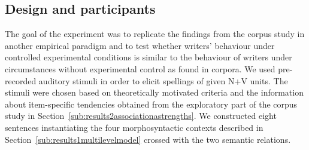 \documentclass[biblatex, charis, linguex]{glossa}\usepackage{knitr}
\begin{document}
\subsection{Design and participants}
\label{sub:designandparticipants}

The goal of the experiment was to replicate the findings from the corpus study in another empirical paradigm and to test whether writers' behaviour under controlled experimental conditions is similar to the behaviour of writers under circumstances without experimental control as found in corpora.
We used pre-recorded auditory stimuli in order to elicit spellings of given N+V units.
The stimuli were chosen based on theoretically motivated criteria and the information about item-specific tendencies obtained from the exploratory part of the corpus study in Section~\ref{sub:results2associationastrengths}.
We constructed eight sentences instantiating the four morphosyntactic contexts described in Section~\ref{sub:results1multilevelmodel} crossed with the two semantic relations.

\begin{table}[h!]
\centering
{}
\caption{Items from the experiment, chosen by context and relation, with control for lexical attraction scores} 
\label{tab:designtable}
\end{table}
\end{document}
